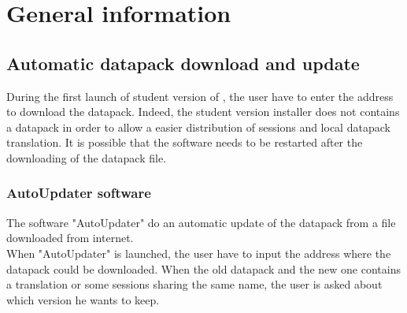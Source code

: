 \chapter{General information}
\section{Automatic datapack download and update}
During the first launch of student version of \tria, the user have to enter the address to download the datapack. Indeed, the student version installer does not contains a datapack in order to allow a easier distribution of sessions and local datapack translation. It is possible that the software needs to be restarted after the downloading of the datapack file.\\


\subsection{AutoUpdater software}
The software "AutoUpdater" do an automatic update of the datapack from a file downloaded from internet.\\

When "AutoUpdater" is launched, the user have to input the address where the datapack could be downloaded. When the old datapack and the new one contains a translation or some sessions sharing the same name, the user is asked about which version he wants to keep.\\

